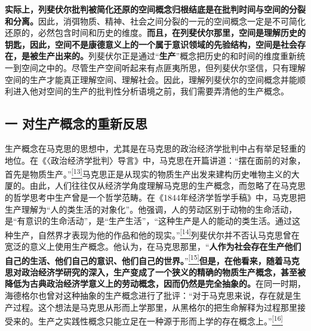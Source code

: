 \documentclass[UTF8, fontset = sourcesans, a4paper, oneside, zihao =
-4, scheme=chinese, no-math, space=true]{ctexbook}
\begin{document}
\textbf{实际上，列斐伏尔批判被简化还原的空间概念归根结底是在批判时间与空间的分裂和分离。}因此，消弭物质、精神、社会之间分裂的一元的空间概念一定是不可简化还原的，必然包含时间和历史的维度。\textbf{而且，在列斐伏尔那里，空间是理解历史的钥匙，因此，空间不是康德意义上的一个属于意识领域的先验结构，空间是社会存在，是被生产出来的。}列斐伏尔正是通过``\textbf{生产}''概念把历史的和时间的维度重新统一到空间之中的。尽管生产空间听起来有点匪夷所思，但列斐伏尔坚信，只有理解空间的生产才能真正理解空间、理解社会。因此，理解列斐伏尔的空间概念并能顺利进入他对空间的生产的批判性分析语境之前，我们需要弄清他的生产概念。

\subsection{一
对生产概念的重新反思}\label{part0006_split_002.htmlux5cux23c016}

生产概念在马克思的思想中，尤其是在马克思的政治经济学批判中占有举足轻重的地位。在《〈政治经济学批判〉导言》中，马克思在开篇讲道：``摆在面前的对象，首先是物质生产。''\protect\hypertarget{part0006_split_002.htmlux5cux23w13}{}{}\protect\hyperlink{part0006_split_003.htmlux5cux23m13}{\textsuperscript{{[}13{]}}}马克思正是从现实的物质生产出发来建构历史唯物主义的大厦的。由此，人们往往仅从经济学角度理解马克思的生产概念，而忽略了在马克思的哲学思考中生产曾是一个哲学范畴。在《1844年经济学哲学手稿》中，马克思把生产理解为``人的类生活的对象化''。他强调，人的劳动区别于动物的生命活动，是``有意识的生命活动''，是``生产生活''，``这种生产是人的能动的类生活。通过这种生产，自然界才表现为他的作品和他的现实。''\protect\hypertarget{part0006_split_002.htmlux5cux23w14}{}{}\protect\hyperlink{part0006_split_003.htmlux5cux23m14}{\textsuperscript{{[}14{]}}}列斐伏尔并不否认马克思曾在宽泛的意义上使用生产概念。他认为，在马克思那里，``\textbf{人作为社会存在生产他们自己的生活、他们自己的意识、他们自己的世界。}''\protect\hypertarget{part0006_split_002.htmlux5cux23w15}{}{}\protect\hyperlink{part0006_split_003.htmlux5cux23m15}{\textsuperscript{{[}15{]}}}\textbf{但是，在他看来，随着马克思对政治经济学研究的深入，生产变成了一个狭义的精确的物质生产概念，甚至被降低为古典政治经济学意义上的劳动概念，因而仍然是完全抽象的。}在同一时期，海德格尔也曾对这种抽象的生产概念进行了批评：``对于马克思来说，存在就是生产过程。这个想法是马克思从形而上学那里，从黑格尔的把生命解释为过程那里接受来的。生产之实践性概念只能立足在一种源于形而上学的存在概念上。''\protect\hypertarget{part0006_split_002.htmlux5cux23w16}{}{}\protect\hyperlink{part0006_split_003.htmlux5cux23m16}{\textsuperscript{{[}16{]}}}
\end{document}
